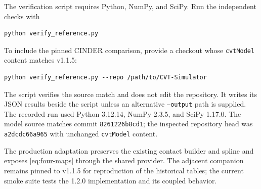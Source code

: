 \documentclass[11pt,letterpaper]{article}
\numberwithin{equation}{section}
\begin{document}
The verification script requires Python, NumPy, and SciPy. Run the independent checks with
\begin{lstlisting}[language={}]
python verify_reference.py
\end{lstlisting}
To include the pinned CINDER comparison, provide a checkout whose \texttt{cvtModel} content matches v1.1.5:
\begin{lstlisting}[language={}]
python verify_reference.py --repo /path/to/CVT-Simulator
\end{lstlisting}
The script verifies the source match and does not edit the repository. It writes its JSON results beside the script unless an alternative \texttt{--output} path is supplied. The recorded run used Python 3.12.14, NumPy 2.3.5, and SciPy 1.17.0. The model source matches commit \texttt{8261226b8cd1}; the inspected repository head was \texttt{a2dcdc66a965} with unchanged \texttt{cvtModel} content.

The production adaptation preserves the existing contact builder and spline and exposes \cref{eq:four-maps} through the shared provider. The adjacent companion remains pinned to v1.1.5 for reproduction of the historical tables; the current smoke suite tests the 1.2.0 implementation and its coupled behavior.
\end{document}
